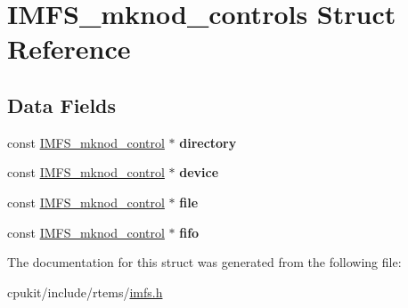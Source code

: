 \hypertarget{structIMFS__mknod__controls}{}\section{I\+M\+F\+S\+\_\+mknod\+\_\+controls Struct Reference}
\label{structIMFS__mknod__controls}
\subsection*{Data Fields}
\begin{DoxyCompactItemize}
\item 
\mbox{\label{structIMFS__mknod__controls_a490278e5b2bfe4193c656ad8c8207c51}} 
const \mbox{\hyperlink{structIMFS__mknod__control}{I\+M\+F\+S\+\_\+mknod\+\_\+control}} $\ast$ {\bfseries directory}
\item 
\mbox{\label{structIMFS__mknod__controls_a6c7c0ea811624e7094fedf85dc78d3a1}} 
const \mbox{\hyperlink{structIMFS__mknod__control}{I\+M\+F\+S\+\_\+mknod\+\_\+control}} $\ast$ {\bfseries device}
\item 
\mbox{\label{structIMFS__mknod__controls_ae67933c35db4690198cfac48f494b567}} 
const \mbox{\hyperlink{structIMFS__mknod__control}{I\+M\+F\+S\+\_\+mknod\+\_\+control}} $\ast$ {\bfseries file}
\item 
\mbox{\label{structIMFS__mknod__controls_a99dc77e9ab5852ffa766546683b131e3}} 
const \mbox{\hyperlink{structIMFS__mknod__control}{I\+M\+F\+S\+\_\+mknod\+\_\+control}} $\ast$ {\bfseries fifo}
\end{DoxyCompactItemize}


The documentation for this struct was generated from the following file\+:\begin{DoxyCompactItemize}
\item 
cpukit/include/rtems/\mbox{\hyperlink{imfs_8h}{imfs.\+h}}\end{DoxyCompactItemize}
